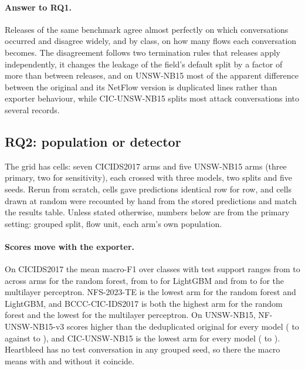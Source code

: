 \documentclass[pdflatex,sn-mathphys-num]{sn-jnl}
\newcommand{\cicids}{CICIDS2017}
\theoremstyle{thmstyleone}%
\theoremstyle{thmstylethree}%
\begin{document}
\paragraph{Answer to RQ1.} Releases of the same benchmark agree almost perfectly on which conversations occurred and disagree widely, and by class, on how many flows each conversation becomes. The disagreement follows two termination rules that releases apply independently, it changes the leakage of the field's default split by a factor of more than \RQoneLeakFactor{} between releases, and on UNSW-NB15 most of the apparent difference between the original and its NetFlow version is duplicated lines rather than exporter behaviour, while CIC-UNSW-NB15 splits most attack conversations into several records.

\subsection{RQ2: population or detector}\label{sec:rq2}

The grid has \RQtwoCells{} cells: seven \cicids{} arms and five UNSW-NB15 arms (three primary, two for sensitivity), each crossed with three models, two splits and five seeds. Rerun from scratch, \RQtwoReproCells{} cells gave predictions identical row for row, and \RQtwoSanityCells{} cells drawn at random were recounted by hand from the stored predictions and match the results table. Unless stated otherwise, numbers below are from the primary setting: grouped split, flow unit, each arm's own population.

\paragraph{Scores move with the exporter.} On \cicids{} the mean macro-F1 over classes with test support ranges from \RQtwoMacroRfMin{} to \RQtwoMacroRfMax{} across arms for the random forest, from \RQtwoMacroLgbmMin{} to \RQtwoMacroLgbmMax{} for LightGBM and from \RQtwoMacroMlpMin{} to \RQtwoMacroMlpMax{} for the multilayer perceptron. NFS-2023-TE is the lowest arm for the random forest and LightGBM, and BCCC-CIC-IDS2017 is both the highest arm for the random forest and the lowest for the multilayer perceptron. On UNSW-NB15, NF-UNSW-NB15-v3 scores higher than the deduplicated original for every model (\RQtwoUnswVthreeMin{} to \RQtwoUnswVthreeMax{} against \RQtwoUnswDedupMin{} to \RQtwoUnswDedupMax{}), and CIC-UNSW-NB15 is the lowest arm for every model (\RQtwoUnswCicMin{} to \RQtwoUnswCicMax{}). Heartbleed has no test conversation in any grouped seed, so there the macro means with and without it coincide.
\end{document}
